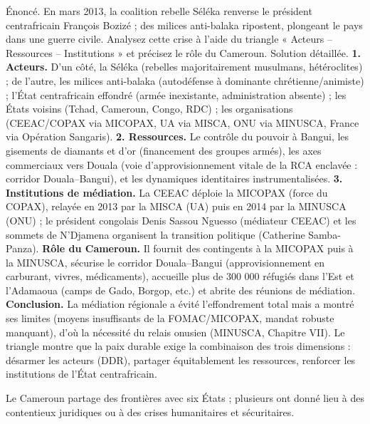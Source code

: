 \documentclass[11pt]{article}
\newcounter{popsec}
\newcounter{popsub}
\newcommand{\courssub}[1]{%
  \stepcounter{popsub}%
  \par\vspace{9pt}\noindent{\popxbold\fontsize{11.5}{13}\selectfont\color{popink}{\color{poporange}\thepopsec.\thepopsub}\hspace{6pt}#1}\par\nopagebreak\vspace{4pt}
}
\begin{document}
\begin{exoresolu}
Énoncé. En mars 2013, la coalition rebelle Séléka renverse le président centrafricain François Bozizé ; des milices anti-balaka ripostent, plongeant le pays dans une guerre civile. Analysez cette crise à l'aide du triangle « Acteurs -- Ressources -- Institutions » et précisez le rôle du Cameroun.
\tcblower
Solution détaillée.
\textbf{1. Acteurs.} D'un côté, la Séléka (rebelles majoritairement musulmans, hétéroclites) ; de l'autre, les milices anti-balaka (autodéfense à dominante chrétienne/animiste) ; l'État centrafricain effondré (armée inexistante, administration absente) ; les États voisins (Tchad, Cameroun, Congo, RDC) ; les organisations (CEEAC/COPAX via MICOPAX, UA via MISCA, ONU via MINUSCA, France via Opération Sangaris).
\textbf{2. Ressources.} Le contrôle du pouvoir à Bangui, les gisements de diamants et d'or (financement des groupes armés), les axes commerciaux vers Douala (voie d'approvisionnement vitale de la RCA enclavée : corridor Douala--Bangui), et les dynamiques identitaires instrumentalisées.
\textbf{3. Institutions de médiation.} La CEEAC déploie la MICOPAX (force du COPAX), relayée en 2013 par la MISCA (UA) puis en 2014 par la MINUSCA (ONU) ; le président congolais Denis Sassou Nguesso (médiateur CEEAC) et les sommets de N'Djamena organisent la transition politique (Catherine Samba-Panza).
\textbf{Rôle du Cameroun.} Il fournit des contingents à la MICOPAX puis à la MINUSCA, sécurise le corridor Douala--Bangui (approvisionnement en carburant, vivres, médicaments), accueille plus de 300 000 réfugiés dans l'Est et l'Adamaoua (camps de Gado, Borgop, etc.) et abrite des réunions de médiation.
\textbf{Conclusion.} La médiation régionale a évité l'effondrement total mais a montré ses limites (moyens insuffisants de la FOMAC/MICOPAX, mandat robuste manquant), d'où la nécessité du relais onusien (MINUSCA, Chapitre VII). Le triangle montre que la paix durable exige la combinaison des trois dimensions : désarmer les acteurs (DDR), partager équitablement les ressources, renforcer les institutions de l'État centrafricain.
\end{exoresolu}

\courssub{La gestion des crises frontalières}

Le Cameroun partage des frontières avec six États ; plusieurs ont donné lieu à des contentieux juridiques ou à des crises humanitaires et sécuritaires.
\end{document}
